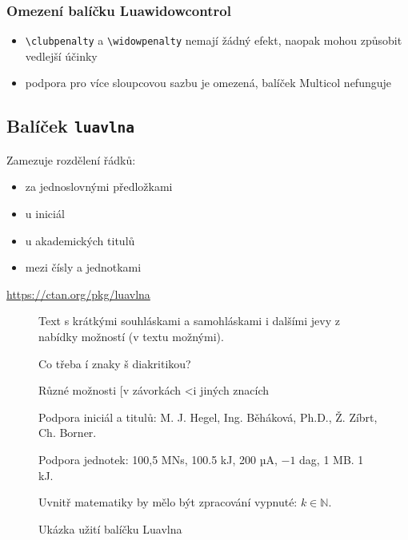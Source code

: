 \documentclass{csbulletin}
\begin{document}
\subsubsection{Omezení balíčku Luawidowcontrol}

    \begin{itemize}
      \item \verb|\clubpenalty| a \verb|\widowpenalty| nemají žádný efekt, naopak mohou způsobit vedlejší účinky
      \item  podpora pro více sloupcovou sazbu je omezená, balíček Multicol nefunguje
  \end{itemize}


  \subsection{Balíček \texttt{luavlna}}

    Zamezuje rozdělení řádků:

      \begin{itemize}
        \item za jednoslovnými předložkami
        \item u iniciál
        \item u akademických titulů
        \item mezi čísly a jednotkami
      \end{itemize}
  \url{https://ctan.org/pkg/luavlna}


\begin{figure}
  \begin{minipage}{3in}

    \preventsingledebugon

    Text s krátkými souhláskami a samohláskami i dalšími jevy
    z nabídky možností (v textu možnými).

    Co třeba í znaky š diakritikou?

    Různé možnosti [v závorkách \textless i jiných znacích

    Podpora iniciál a titulů: M. J. Hegel, Ing. Běháková, Ph.D., Ž. Zíbrt,
    Ch. Borner.

    Podpora jednotek: 100,5 MN\cdot{}s, 100.5 kJ, 200 µA, $-1$ dag, 1 MB. 1 kJ.

    Uvnitř matematiky by mělo být zpracování vypnuté: $k \in \mathbb N$.

    \preventsingledebugoff
  \end{minipage}
  \caption{Ukázka užití balíčku Luavlna}
\end{figure}
\end{document}
